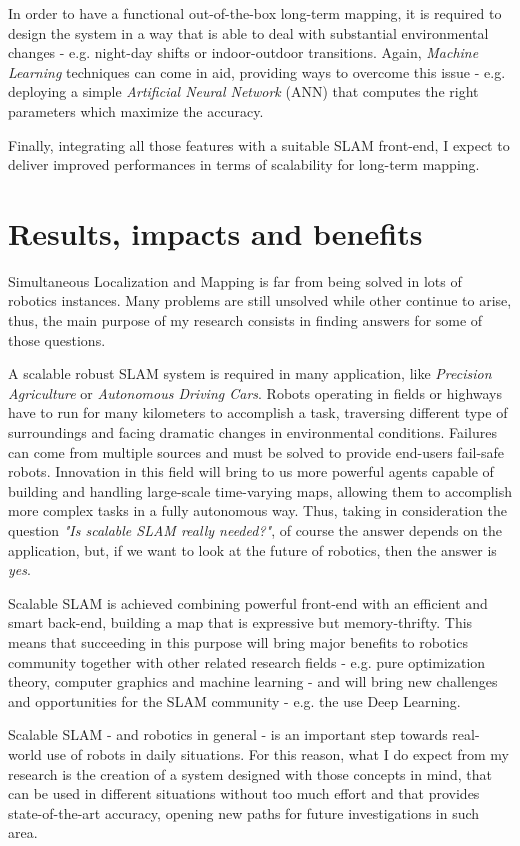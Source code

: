 \documentclass[10pt,a4paper, notitlepage]{report}
\begin{document}
In order to have a functional out-of-the-box long-term mapping, it is required to design the system in a way that is able to deal with substantial environmental changes - e.g. night-day shifts or indoor-outdoor transitions. Again, \textit{Machine Learning} techniques can come in aid, providing ways to overcome this issue - e.g. deploying a simple \textit{Artificial Neural Network} (ANN) that computes the right parameters which maximize the accuracy.

Finally, integrating all those features with a suitable SLAM front-end, I expect to deliver improved performances in terms of scalability for long-term mapping.

\section*{Results, impacts and benefits}
Simultaneous Localization and Mapping is far from being solved in lots of robotics instances. Many problems are still unsolved while other continue to arise, thus, the main purpose of my research consists in finding answers for some of those questions. 

A scalable robust SLAM system is required in many application, like \textit{Precision Agriculture} or \textit{Autonomous Driving Cars}. Robots operating in fields or highways have to run for many kilometers to accomplish a task, traversing different type of surroundings and facing dramatic changes in environmental conditions. Failures can come from multiple sources and must be solved to provide end-users fail-safe robots. Innovation in this field will bring to us more powerful agents capable of building and handling large-scale time-varying maps, allowing them to accomplish more complex tasks in a fully autonomous way. Thus, taking in consideration the question \textit{"Is scalable SLAM really needed?"}, of course the answer depends on the application, but, if we want to look at the future of robotics, then the answer is \textit{yes}.

Scalable SLAM is achieved combining powerful front-end with an efficient and smart back-end, building a map that is expressive but memory-thrifty. This means that succeeding in this purpose will bring major benefits to robotics community together with other related research fields - e.g. pure optimization theory, computer graphics and machine learning -  and will bring new challenges and opportunities for the SLAM community - e.g. the use Deep Learning. 

\vspace{15px}

Scalable SLAM - and robotics in general - is an important step towards real-world use of robots in daily situations. For this reason, what I do expect from my research is the creation of a system designed with those concepts in mind, that can be used in different situations without too much effort and that provides state-of-the-art accuracy, opening new paths for future investigations in such area.






\end{document}
